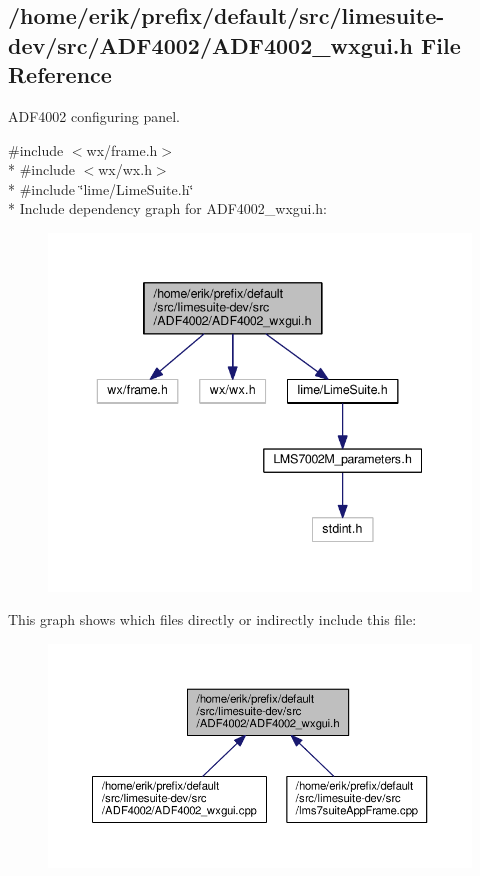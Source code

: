 \subsection{/home/erik/prefix/default/src/limesuite-\/dev/src/\+A\+D\+F4002/\+A\+D\+F4002\+\_\+wxgui.h File Reference}
\label{ADF4002__wxgui_8h}


A\+D\+F4002 configuring panel.  


{\ttfamily \#include $<$wx/frame.\+h$>$}\\*
{\ttfamily \#include $<$wx/wx.\+h$>$}\\*
{\ttfamily \#include \char`\"{}lime/\+Lime\+Suite.\+h\char`\"{}}\\*
Include dependency graph for A\+D\+F4002\+\_\+wxgui.\+h\+:
\nopagebreak
\begin{figure}[H]
\begin{center}
\leavevmode
\includegraphics[width=343pt]{db/d69/ADF4002__wxgui_8h__incl}
\end{center}
\end{figure}
This graph shows which files directly or indirectly include this file\+:
\nopagebreak
\begin{figure}[H]
\begin{center}
\leavevmode
\includegraphics[width=350pt]{d8/d3b/ADF4002__wxgui_8h__dep__incl}
\end{center}
\end{figure}
